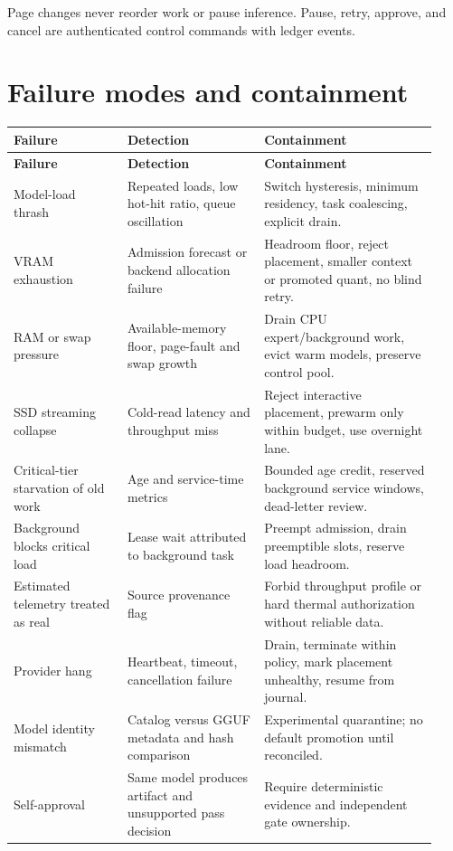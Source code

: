 \documentclass[11pt,letterpaper]{article}
\begin{document}
Page changes never reorder work or pause inference. Pause, retry, approve, and
cancel are authenticated control commands with ledger events.

\section{Failure modes and containment}

\begin{longtable}{@{}L{0.25\linewidth}L{0.30\linewidth}L{0.38\linewidth}@{}}
\toprule
\textbf{Failure} & \textbf{Detection} & \textbf{Containment} \\
\midrule
\endfirsthead
\toprule
\textbf{Failure} & \textbf{Detection} & \textbf{Containment} \\
\midrule
\endhead
Model-load thrash &
Repeated loads, low hot-hit ratio, queue oscillation &
Switch hysteresis, minimum residency, task coalescing, explicit drain. \\
VRAM exhaustion &
Admission forecast or backend allocation failure &
Headroom floor, reject placement, smaller context or promoted quant, no blind
retry. \\
RAM or swap pressure &
Available-memory floor, page-fault and swap growth &
Drain CPU expert/background work, evict warm models, preserve control pool. \\
SSD streaming collapse &
Cold-read latency and throughput miss &
Reject interactive placement, prewarm only within budget, use overnight lane. \\
Critical-tier starvation of old work &
Age and service-time metrics &
Bounded age credit, reserved background service windows, dead-letter review. \\
Background blocks critical load &
Lease wait attributed to background task &
Preempt admission, drain preemptible slots, reserve load headroom. \\
Estimated telemetry treated as real &
Source provenance flag &
Forbid throughput profile or hard thermal authorization without reliable data. \\
Provider hang &
Heartbeat, timeout, cancellation failure &
Drain, terminate within policy, mark placement unhealthy, resume from journal. \\
Model identity mismatch &
Catalog versus GGUF metadata and hash comparison &
Experimental quarantine; no default promotion until reconciled. \\
Self-approval &
Same model produces artifact and unsupported pass decision &
Require deterministic evidence and independent gate ownership. \\

\end{longtable}
\end{document}
